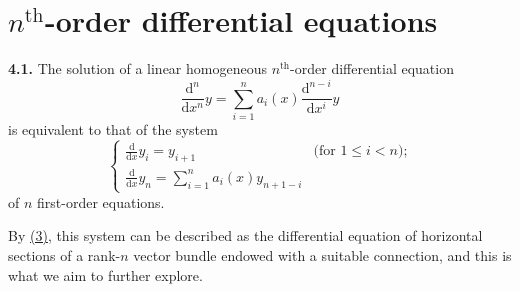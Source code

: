 \documentclass{report}
\newenvironment{rmenv}[1]
  {\phantomsection\par\medskip\noindent\textbf{#1.}\rmfamily}
  {\medskip}
\newcommand{\dd}{\mathrm{d}}
\renewcommand{\leq}{\leqslant}
\begin{document}
\section{\texorpdfstring{$n^\mathrm{th}$}{nth}-order differential equations}
\label{I.4}

\begin{rmenv}{4.1}
\label{I.4.1}
  The solution of a linear homogeneous $n^\mathrm{th}$-order differential equation
  \[
  \label{I.4.1.1}
    \frac{\dd^n}{\dd x^n}y = \sum_{i=1}^n a_i(x) \frac{\dd^{n-i}}{\dd x^i}y
  \tag{4.1.1}
  \]
  is equivalent to that of the system
  \[
  \label{I.4.1.2}
    \begin{cases}
      \frac{\dd}{\dd x}y_i
      = y_{i+1} &\mbox{(for $1\leq i<n$);}
    \\\frac{\dd}{\dd x}y_n
      = \sum_{i=1}^n a_i(x) y_{n+1-i}
    \end{cases}
  \tag{4.1.2}
  \]
  of $n$ first-order equations.

  By \hyperref[I.3]{(3)}, this system can be described as the differential equation of horizontal sections of a rank-$n$ vector bundle endowed with a suitable connection, and this is what we aim to further explore.
\end{rmenv}
\end{document}
